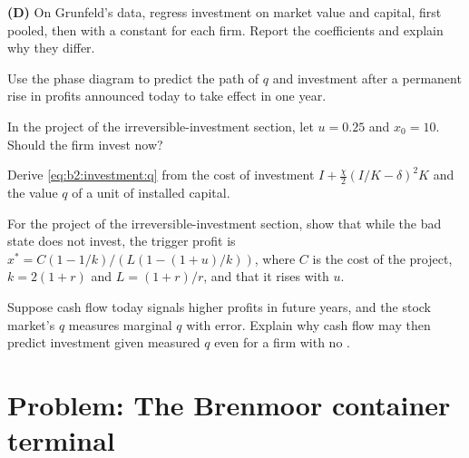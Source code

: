 \begin{exercise}[$\star\star$]\label{exo:b2:investment:7}
\textbf{(D)} On Grunfeld's data, regress investment on market value and capital, first pooled, then with a constant for
each firm. Report the coefficients and explain why they differ.
\end{exercise}

\begin{exercise}[$\star\star$]\label{exo:b2:investment:8}
Use the phase diagram to predict the path of $q$ and investment after a permanent rise in profits announced today to take
effect in one year.
\end{exercise}

\begin{exercise}[$\star\star$]\label{exo:b2:investment:9}
In the project of the irreversible-investment section, let $u = 0.25$ and $x_0 = 10$. Should the firm invest now?
\end{exercise}

\begin{exercise}[$\star\star\star$]\label{exo:b2:investment:10}
Derive \eqref{eq:b2:investment:q} from the cost of investment $I + \tfrac{\chi}{2}(I/K - \delta)^2K$ and the value $q$ of a unit of installed capital.
\end{exercise}

\begin{exercise}[$\star\star\star$]\label{exo:b2:investment:11}
For the project of the irreversible-investment section, show that while the bad state does not invest, the trigger
profit is $x^* = C(1 - 1/k)/(L(1 - (1 + u)/k))$, where $C$ is the cost of the project, $k = 2(1 + r)$ and $L = (1 + r)/r$, and that it rises with $u$.
\end{exercise}

\begin{exercise}[$\star\star\star$]\label{exo:b2:investment:12}
Suppose cash flow today signals higher profits in future years, and the stock market's $q$ measures marginal $q$ with error.
Explain why cash flow may then predict investment given measured $q$ even for a firm with no .
\end{exercise}

\section{Problem: The Brenmoor container terminal}\label{sec:b2:investment:problem}

